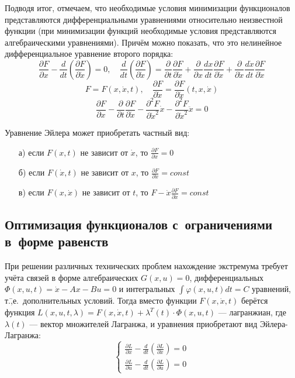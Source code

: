 \documentclass[preprint,russian,a5paper,10pt,twoside,mediummath]{ncc}
\begin{document}
Подводя итог, отмечаем, что необходимые условия минимизации функционалов представляются дифференциальными уравнениями относительно неизвестной функции (при минимизации функций не\-обходимые условия представляются алгебраическими уравнениями). Причём можно показать, что это нелинейное дифференциальное ура\-в\-нение второго порядка:
\[ \frac{\partial F}{\partial x}-\frac{d}{dt}\left( \frac{\partial F}{\partial \dot{x}} \right)=0, \quad \frac{d}{dt}\left( \frac{\partial F}{\partial \dot{x}} \right)=\frac{\partial }{\partial t}\frac{\partial F}{\partial \dot{x}} + \frac{\partial }{\partial x} \frac{dx}{dt} \frac{\partial F}{\partial \dot{x}} + \frac{\partial }{\partial \dot{x}} \frac{d\dot{x}}{dt} \frac{\partial F}{\partial \dot{x}} \]
\[ F = F\left( x, \dot{x}, t \right) ,\quad \frac{\partial F}{\partial \dot{x}}=\frac{\partial F}{\partial \dot{x}}\left( t,x,\dot{x} \right) \]
\[ \frac{\partial F}{\partial x} - \frac{\partial }{\partial t} \frac{\partial F}{\partial \dot{x}} - \frac{\partial ^2 F}{\partial \dot{x} ^2}\dot{x} - \frac{{{\partial }^{2}}F}{\partial {{{\dot{x}}}^{2}}}\ddot{x} = 0 \]

Уравнение Эйлера может приобретать частный вид:
\begin{enumerate}
\item[а)] если $ F\left( x,t \right) $ не зависит от $\dot{x}$, то $\frac{\partial F}{\partial x}=0$
\item[б)] если $F\left( \dot{x},t \right)$ не зависит от $x$, то $\frac{\partial F}{\partial \dot{x}}=const$ 
\item[в)] если $F\left( x,\dot{x} \right)$ не зависит от $t$, то $ F - \dot{x} \frac{\partial F}{\partial \dot{x}} = const $
\end{enumerate}

\vspace{.5\baselineskip}
	\subsection{Оптимизация функционалов с~ограничениями в~форме равенств\label{variations:conditional_extremum}}

При решении различных технических проблем нахождение экстремума требует учёта связей в форме алгебраических $ G(x,u)=0 $, дифференциальных $ \Phi (x,u,t) = \dot{x} - Ax - Bu = 0 $ и интегральных $ \int\varphi (x,u,t)dt = C $ уравнений, т.\=,е.~дополнительных условий. Тогда вместо функции $F\left( x, \dot{x}, t \right)$ берётся функция $L\left( x,u,t,\lambda  \right)=F\left( x,\dot{x},t \right) + \lambda ^T (t) \cdot \Phi \left( x,u,t \right)$ --- лагранжиан, где $ \lambda (t) $ --- вектор множителей Лагранжа, и уравнения приобретают вид Эйлера-Лагранжа:
\begin{equation}
\left\{ \begin{array}{l}
	\frac{\partial L}{\partial x} - \frac{d}{dt} \left( \frac{\partial L}{\partial \dot{x}} \right) = 0 \\[2ex]
	\frac{\partial L}{\partial u} - \frac{d}{dt} \left( \frac{\partial L}{\partial \dot{u}} \right) = 0
\end{array} \right.
\end{equation}
\end{document}
